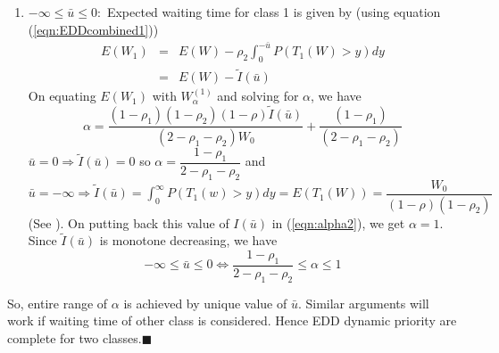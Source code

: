 \documentclass[letterpaper, 10 pt, conference]{ieeeconf}  %
\newenvironment{mythm}[1]{{ \textbf{\textit{Proof of Theorem #1:}}}}{}
\begin{document}
\begin{appendices}
\begin{mythm}{\ref{clm:EDDcomplete}}
\begin{enumerate}
\begin{equation}
0 \leq \bar{u} \leq \infty \Leftrightarrow 0 \leq \alpha \leq \frac{1-\rho_1}{2-\rho_1 -\rho_2}
\end{equation}
\item $-\infty \leq \bar{u} \leq 0:$ Expected waiting time for class 1 is given by (using equation (\ref{eqn:EDDcombined1}))
\begin{eqnarray} \nonumber
E(W_1) &=& E(W) - \rho_2 \int_0^{-\bar{u}}P(T_1(W)> y)dy\\\nonumber
&=& E(W) - \tilde{I}(\bar{u})
\end{eqnarray}
On equating $E(W_1)$ with $W_{\alpha}^{(1)}$ and solving for $\alpha$, we have 
\begin{equation}\label{eqn:alpha2}
\alpha = \dfrac{(1-\rho_1)(1-\rho_2)(1-\rho)\tilde{I}(\bar{u})}{(2-\rho_1 -\rho_2)W_0} + \dfrac{(1-\rho_1)}{(2-\rho_1 - \rho_2)}
\end{equation}
$\bar{u} = 0 \Rightarrow  \tilde{I}(\bar{u}) = 0$ so $\alpha = \dfrac{1-\rho_1}{2-\rho_1-\rho_2}$ and $\bar{u} = -\infty \Rightarrow \tilde{I}(\bar{u}) = \int_0^{\infty}P(T_1(w)> y)dy = E(T_1(W)) = \dfrac{W_0}{(1-\rho)(1-\rho_2)}$ (See \cite[page 152]{EDDpriority}). On putting back this value of $I(\bar{u})$ in (\ref{eqn:alpha2}), we get $\alpha = 1$. Since $\tilde{I}(\bar{u})$ is monotone decreasing, we have 
\begin{equation}
-\infty \leq \bar{u} \leq 0 \Leftrightarrow \frac{1-\rho_1}{2-\rho_1 -\rho_2}\leq \alpha \leq 1
\end{equation} 
\end{enumerate} 
So, entire range of $\alpha$ is achieved by unique value of $\bar{u}$. Similar arguments will work if waiting time of other class is considered. Hence EDD dynamic priority are complete for two classes.\hspace{2.6in}$\blacksquare$
\end{mythm}


\end{appendices}


%
%
%
%
\end{document}
